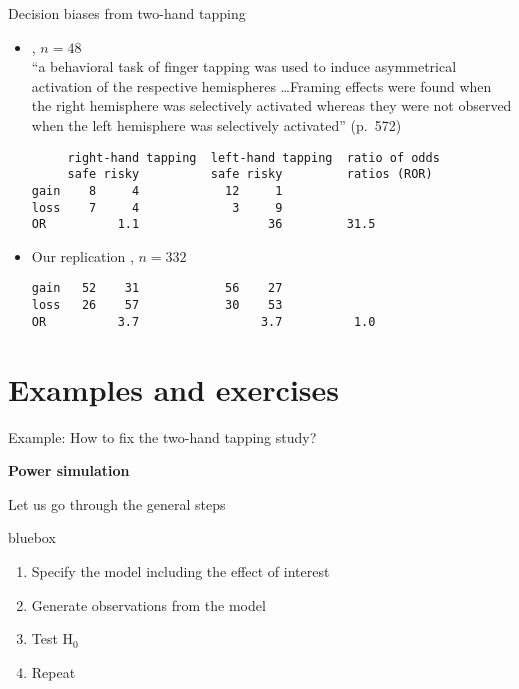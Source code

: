 \documentclass[aspectratio=169]{beamer}
\newenvironment{colbox}[1][\textwidth]%
  {\begin{beamercolorbox}[wd=#1, rounded=true, shadow=true]{bluebox}}
  {\end{beamercolorbox}}
\begin{document}
\begin{frame}[fragile]{Decision biases from two-hand tapping}

\begin{itemize}
\item \citet{McElroySeta04}, $n = 48$\\[1ex]

``a behavioral task of finger tapping was used to induce asymmetrical
activation of the respective hemispheres \dots Framing effects were found when
the right hemisphere was selectively activated whereas they were not observed
when the left hemisphere was selectively activated'' (p.~572)

\begin{lstlisting}
     right-hand tapping  left-hand tapping  ratio of odds
     safe risky          safe risky         ratios (ROR)
gain    8     4            12     1
loss    7     4             3     9
OR          1.1                  36         31.5
\end{lstlisting}

\item Our replication \citep[see][]{Gelman20}, $n = 332$
\begin{lstlisting}
gain   52    31            56    27
loss   26    57            30    53
OR          3.7                 3.7          1.0
\end{lstlisting}
\end{itemize}

\end{frame}




\section{Examples and exercises}


\begin{frame}{Example: How to fix the two-hand tapping study?}

  {\bf Power simulation\\[2ex]}

  Let us go through the general steps\\[2ex]
\begin{colbox}
\begin{enumerate}
  \item Specify the model including the effect of interest
  \item Generate observations from the model
  \item Test H$_0$
  \item Repeat
\end{enumerate}
\end{colbox}
\end{frame}
\end{document}
